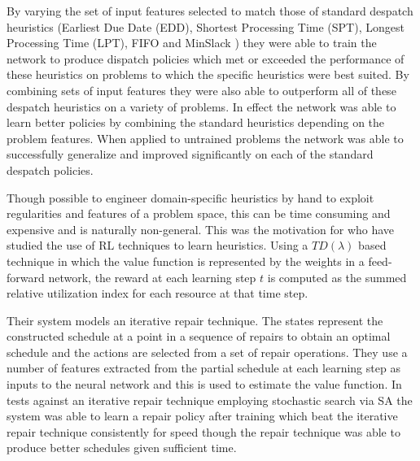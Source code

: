  By varying the set of input features selected to match those of standard despatch heuristics (Earliest Due Date (EDD), Shortest Processing Time (SPT), Longest Processing Time (LPT), FIFO and MinSlack \citep{smith93slack}) they were able to train the network to produce dispatch policies which met or exceeded the performance of these heuristics on problems to which the specific heuristics were best suited. By combining sets of input features they were also able to outperform all of these despatch heuristics on a variety of problems. In effect the network was able to learn better policies by combining the standard heuristics depending on the problem features. When applied to untrained problems the network was able to successfully generalize and improved significantly on each of the standard despatch policies.

Though possible to engineer domain-specific heuristics by hand to exploit regularities and features of a problem space, this can be time consuming and expensive and is naturally non-general. This was the motivation for \citet{zhang95reinforcement} who have studied the use of RL techniques to learn heuristics. Using a $TD(\lambda)$ based technique in which the value function is represented by the weights in a feed-forward network, the reward at each learning step $t$ is computed as the summed relative utilization index for each resource at that time step.


Their system models an iterative repair technique. The states represent the constructed schedule at a point in a sequence of repairs to obtain an optimal schedule and the actions are selected from a set of repair operations. They use a number of features extracted from the partial schedule at each learning step as inputs to the neural network and this is used to estimate the value function. In tests against an iterative repair technique employing stochastic search via SA \citep{zweben94scheduling} the system was able to learn a repair policy after training which beat the iterative repair technique consistently for speed though the repair technique was able to produce better schedules given sufficient time.


